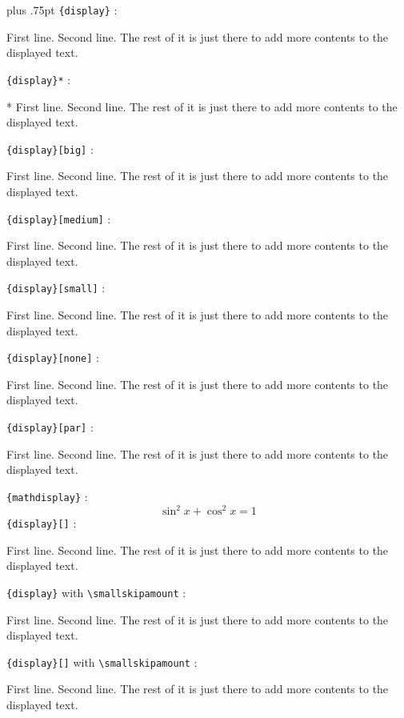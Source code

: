 \documentclass[fleqn]{article}
\begin{document}
\parskip 1pt plus .75pt
\noindent
\verb|{display}| : \blindtext[1]
\begin{display}
First line.
Second line.
The rest of it is just there to add more contents to the displayed text.
\end{display}
\verb|{display}*| : \blindtext[1]
\begin{display}*
First line.
Second line.
The rest of it is just there to add more contents to the displayed text.
\end{display}
\verb|{display}[big]| : \blindtext[1]
\begin{display}[big]
First line.
Second line.
The rest of it is just there to add more contents to the displayed text.
\end{display}
\verb|{display}[medium]| : \blindtext[1]
\begin{display}[medium]
First line.
Second line.
The rest of it is just there to add more contents to the displayed text.
\end{display}
\verb|{display}[small]| : \blindtext[1]
\begin{display}[small]
First line.
Second line.
The rest of it is just there to add more contents to the displayed text.
\end{display}
\verb|{display}[none]| : \blindtext[1]
\begin{display}[none]
First line.
Second line.
The rest of it is just there to add more contents to the displayed text.
\end{display}
\verb|{display}[par]| : \blindtext[1]
\begin{display}[par]
First line.
Second line.
The rest of it is just there to add more contents to the displayed text.
\end{display}
\verb|{mathdisplay}| : \blindtext[1]
\begin{displaymath}
        \sin^2 x + \cos^2 x = 1
\end{displaymath}
\verb|{display}[]| : \blindtext[1]
\begin{display}[]
First line.
Second line.
The rest of it is just there to add more contents to the displayed text.
\end{display}
\begingroup
\makeatletter
\let\rs@displayskip\smallskipamount
\makeatother
\verb|{display}| with \verb|\smallskipamount| : \blindtext[1]
\begin{display}
First line.
Second line.
The rest of it is just there to add more contents to the displayed text.
\end{display}
\verb|{display}[]| with \verb|\smallskipamount| : \blindtext[1]
\begin{display}[]
First line.
Second line.
The rest of it is just there to add more contents to the displayed text.
\end{display}
\endgroup
\blindtext[1]
\end{document}
